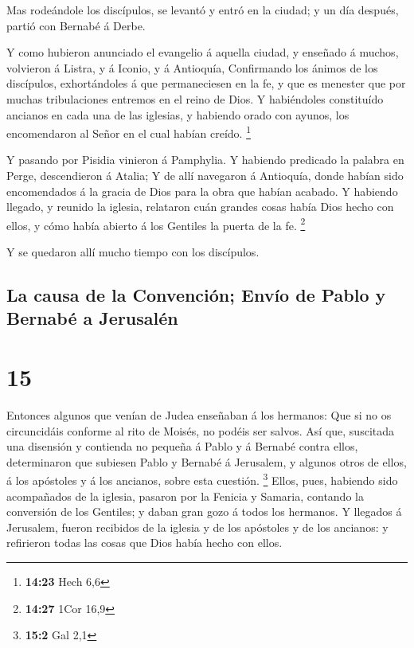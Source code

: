 Mas rodeándole los discípulos, se levantó y entró en la
ciudad; y un día después, partió con Bernabé á Derbe.

 Y como hubieron anunciado el evangelio á aquella ciudad, y
enseñado á muchos, volvieron á Listra, y á Iconio, y á Antioquía,
 Confirmando los ánimos de los discípulos, exhortándoles á
que permaneciesen en la fe, y que es menester que por muchas
tribulaciones entremos en el reino de Dios.  Y habiéndoles
constituído ancianos en cada una de las iglesias, y habiendo orado con
ayunos, los encomendaron al Señor en el cual habían creído. \footnote{\textbf{14:23}
  Hech 6,6}

 Y pasando por Pisidia vinieron á Pamphylia. 
Y habiendo predicado la palabra en Perge, descendieron á Atalia;
 Y de allí navegaron á Antioquía, donde habían sido
encomendados á la gracia de Dios para la obra que habían acabado.
 Y habiendo llegado, y reunido la iglesia, relataron cuán
grandes cosas había Dios hecho con ellos, y cómo había abierto á los
Gentiles la puerta de la fe. \footnote{\textbf{14:27} 1Cor 16,9}

 Y se quedaron allí mucho tiempo con los discípulos.

\hypertarget{la-causa-de-la-convenciuxf3n-envuxedo-de-pablo-y-bernabuxe9-a-jerusaluxe9n}{%
\subsection{La causa de la Convención; Envío de Pablo y Bernabé a
Jerusalén}\label{la-causa-de-la-convenciuxf3n-envuxedo-de-pablo-y-bernabuxe9-a-jerusaluxe9n}}

\hypertarget{section-14}{%
\section{15}\label{section-14}}

 Entonces algunos que venían de Judea enseñaban á los
hermanos: Que si no os circuncidáis conforme al rito de Moisés, no
podéis ser salvos.  Así que, suscitada una disensión y
contienda no pequeña á Pablo y á Bernabé contra ellos, determinaron que
subiesen Pablo y Bernabé á Jerusalem, y algunos otros de ellos, á los
apóstoles y á los ancianos, sobre esta cuestión. \footnote{\textbf{15:2}
  Gal 2,1}  Ellos, pues, habiendo sido acompañados de la
iglesia, pasaron por la Fenicia y Samaria, contando la conversión de los
Gentiles; y daban gran gozo á todos los hermanos.  Y
llegados á Jerusalem, fueron recibidos de la iglesia y de los apóstoles
y de los ancianos: y refirieron todas las cosas que Dios había hecho con
ellos.

